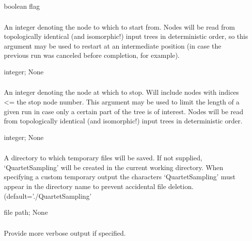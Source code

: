 \documentclass[letterpaper,12pt,english]{sphinxmanual}
\begin{document}
 boolean flag


\subsubsection{}
\label{\detokenize{prog_desc:start-node-number}}
 An integer denoting the node to which to start from. Nodes will be read from topologically identical (and isomorphic!) input trees in deterministic order, so this argument may be  used to restart at an intermediate position (in case the previous run was canceled before completion, for example).

 integer;  None


\subsubsection{}
\label{\detokenize{prog_desc:stop-node-number}}
 An integer denoting the node at which to stop. Will include nodes with indices \textless{}= the stop node number. This argument may be used to limit the length of a given run in case only a certain part of the tree is of interest. Nodes will be read from topologically identical (and isomorphic!) input trees in deterministic order.

 integer;  None


\subsubsection{}
\label{\detokenize{prog_desc:temp-dir}}
 A directory to which temporary files will be saved. If not supplied, ‘QuartetSampling’ will be created in the current working directory. When specifying a custom temporary output the characters ‘QuartetSampling’ must appear in the directory name to prevent accidental file deletion. (default=’./QuartetSampling’

 file path;  None


\subsubsection{}
\label{\detokenize{prog_desc:verbose}}
 Provide more verbose output if specified.
\end{document}
